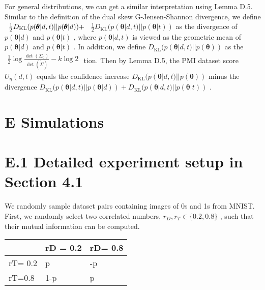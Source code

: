 For general distributions, we can get a similar interpretation using
Lemma D.5. Similar to the definition of the dual skew G-Jensen-Shannon
divergence, we define
\(\begin{array} { r l } { \frac { 1 } { 2 } D _ { \mathrm { K L } } ( p ( \pmb { \theta } | d , t ) | | p ( \pmb { \theta } | d ) ) + } \end{array}\)
\(\scriptstyle { \frac { 1 } { 2 } } D _ { \mathrm { K L } } ( p ( \pmb { \theta } | d , t ) | | p ( \pmb { \theta } | t ) )\)
as the divergence of \(p ( \pmb \theta | d )\) and
\(p ( \pmb \theta | t )\) , where \(p ( \pmb \theta | d , t )\) is
viewed as the geometric mean of \(p ( \pmb \theta | d )\) and
\(p ( \pmb \theta | t )\) . In addition, we define
\(D _ { \mathrm { K L } } ( p ( \pmb { \theta } | d , t ) | | p ( \pmb { \theta } ) )\)
as the
\(\begin{array} { r } { \frac { 1 } { 2 } \log \frac { \operatorname* { d e t } ( \Sigma _ { 0 } ) } { \operatorname* { d e t } ( \widetilde { \Sigma } ) } - k \log 2 } \end{array}\)
tion. Then by Lemma D.5, the PMI dataset score
\(U _ { \eta } ( d , t )\) equals the confidence increase
\(D _ { \mathrm { K L } } ( p ( \pmb { \theta } | d , t ) | | p ( \pmb { \theta } ) )\)
minus the divergence
\(D _ { \mathrm { K L } } ( p ( \pmb \theta | d , t ) | | p ( \pmb \theta | d ) ) + D _ { \mathrm { K L } } ( p ( \pmb \theta | d , t ) | | p ( \pmb \theta | t ) )\)
.

\section{E Simulations}\label{e-simulations}

\section{E.1 Detailed experiment setup in Section
4.1}\label{e.1-detailed-experiment-setup-in-section-4.1}

We randomly sample dataset pairs containing images of 0s and 1s from
MNIST. First, we randomly select two correlated numbers,
\(r _ { D } , r _ { T } \in \{ 0 . 2 , 0 . 8 \}\) , such that their
mutual information can be computed.

\begin{longtable}[]{@{}|l|l|l|@{}}
\toprule\noalign{}
\endhead
\bottomrule\noalign{}
\endlastfoot
\hline
& rD = 0.2 & rD= 0.8 \\
\hline
rT= 0.2 & p & -p \\
\hline
rT=0.8 & 1-p & p \\
\hline
\end{longtable}

